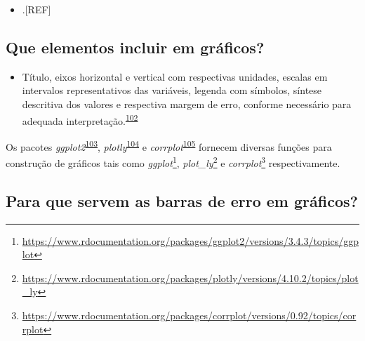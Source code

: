 \documentclass[
  a4paper,
]{book}
\providecommand{\tightlist}{%
  \setlength{\itemsep}{0pt}\setlength{\parskip}{0pt}}
\renewcommand{\href}[2]{#2\footnote{\url{#1}}}
\newenvironment{infobox}[1]
  {
  \begin{itemize}
  \renewcommand{\labelitemi}{
    \raisebox{-.7\height}[0pt][0pt]{
      {\setkeys{Gin}{width=3em,keepaspectratio}
        \texttt{[image: \#1]}}
    }
  }
  \setlength{\fboxsep}{1em}
  \begin{blackbox}
  \item
  }
  {
  \end{blackbox}
  \end{itemize}
  }
\begin{document}
\begin{itemize}
\tightlist
\item
  .{[}REF{]}
\end{itemize}

\hypertarget{que-elementos-incluir-em-gruxe1ficos}{%
\subsection{Que elementos incluir em gráficos?}\label{que-elementos-incluir-em-gruxe1ficos}}

\begin{itemize}
\tightlist
\item
  Título, eixos horizontal e vertical com respectivas unidades, escalas em intervalos representativos das variáveis, legenda com símbolos, síntese descritiva dos valores e respectiva margem de erro, conforme necessário para adequada interpretação.\textsuperscript{\protect\hyperlink{ref-Park2022}{102}}
\end{itemize}

\begin{infobox}{images/Rlogo}
Os pacotes \emph{ggplot2}\textsuperscript{\protect\hyperlink{ref-ggplot2}{103}}, \emph{plotly}\textsuperscript{\protect\hyperlink{ref-plotly}{104}} e \emph{corrplot}\textsuperscript{\protect\hyperlink{ref-corrplot}{105}} fornecem diversas funções para construção de gráficos tais como \href{https://www.rdocumentation.org/packages/ggplot2/versions/3.4.3/topics/ggplot}{\emph{ggplot}}, \href{https://www.rdocumentation.org/packages/plotly/versions/4.10.2/topics/plot_ly}{\emph{plot\_ly}} e \href{https://www.rdocumentation.org/packages/corrplot/versions/0.92/topics/corrplot}{\emph{corrplot}} respectivamente.

\end{infobox}

\hypertarget{para-que-servem-as-barras-de-erro-em-gruxe1ficos}{%
\subsection{Para que servem as barras de erro em gráficos?}\label{para-que-servem-as-barras-de-erro-em-gruxe1ficos}}
\end{document}
